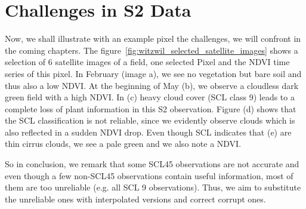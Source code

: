 		
\section{Challenges in S2 Data}{\label{sec:s2_challangges}
	
	Now, we shall illustrate with an example pixel the challenges, we will confront in the coming chapters. The figure~\ref{fig:witzwil_selected_satellite_images} shows a selection of 6 satellite images of a field, one selected Pixel and the NDVI time series of this pixel. 		
	In February (image a), we see no vegetation but bare soil and thus also a low NDVI. At the beginning of May (b), we observe a cloudless dark green field with a high NDVI. In (c) heavy cloud cover (SCL class 9) leads to a complete loss of plant information in this S2 observation. Figure (d) shows that the SCL classification is not reliable, since we evidently observe clouds which is also reflected in a sudden NDVI drop. Even though SCL indicates that (e) are thin cirrus clouds, we see a pale green and we also note a NDVI.

	So in conclusion, we remark that some SCL45 observations are not accurate and even though a few non-SCL45 observations contain useful information, most of them are too unreliable (e.g. all SCL 9 observations). Thus, we aim to substitute the unreliable ones with interpolated versions and correct corrupt ones.
		
}

